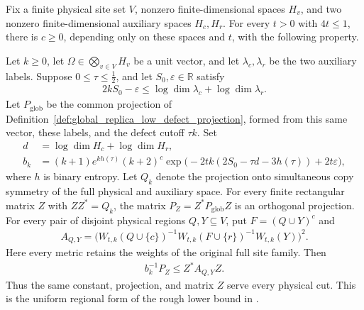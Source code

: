 \begin{theorem}
  \label{thm:global_regional_low_defect_rough_lower_bound}
  \leanok
  Fix a finite physical site set $V$, nonzero finite-dimensional spaces
  $H_v$, and two nonzero finite-dimensional auxiliary spaces $H_c,H_r$.
  For every $t>0$ with $4t\leq1$, there is $c\geq0$, depending only on
  these spaces and $t$, with the following property.

  Let $k\geq0$, let $\Omega\in\bigotimes_{v\in V}H_v$ be a unit vector,
  and let $\lambda_c,\lambda_r$ be the two auxiliary labels. Suppose
  $0\leq\tau\leq\tfrac12$, and let $S_0,\varepsilon\in\mathbb R$ satisfy
  \begin{align*}
    2kS_0-\varepsilon
      \leq\log\dim\lambda_c+\log\dim\lambda_r.
  \end{align*}
  Let $P_{\mathrm{glob}}$ be the common projection of
  Definition~\ref{def:global_replica_low_defect_projection}, formed from
  this same vector, these labels, and the defect cutoff $\tau k$.
  Set
  \begin{align*}
    d&=\log\dim H_c+\log\dim H_r,\\
    b_k&=(k+1)e^{kh(\tau)}(k+2)^c
      \exp\bigl(-2tk(2S_0-\tau d-3h(\tau))+2t\varepsilon\bigr),
  \end{align*}
  where $h$ is binary entropy. Let $Q_k$ denote the projection onto
  simultaneous copy symmetry of the full physical and auxiliary space.
  For every finite rectangular matrix $Z$ with $ZZ^*=Q_k$, the matrix
  $P_Z=Z^*P_{\mathrm{glob}}Z$ is an orthogonal projection. For every pair
  of disjoint physical regions $Q,Y\subseteq V$, put $F=(Q\cup Y)^c$ and
  \begin{align*}
    A_{Q,Y}
      =\bigl(W_{t,k}(Q\cup\{c\})^{-1}
             W_{t,k}(F\cup\{r\})^{-1}W_{t,k}(Y)\bigr)^2.
  \end{align*}
  Here every metric retains the weights of the original full site family.
  Then
  \begin{align*}
    b_k^{-1}P_Z\leq Z^*A_{Q,Y}Z.
  \end{align*}
  Thus the same constant, projection, and matrix $Z$ serve every physical
  cut. This is the uniform regional form of the rough lower bound in
  \cite[Section~8]{OpenAI2026AreaLaw}.
\end{theorem}
